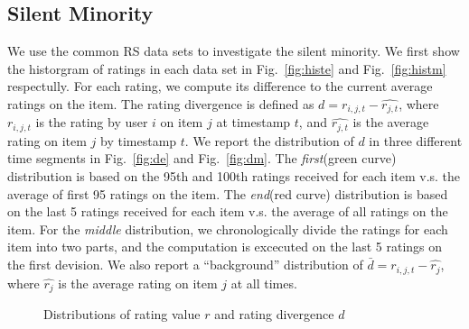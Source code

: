 \documentclass{sig-alternate}
\begin{document}
\subsection{Silent Minority}
 We use the common RS data sets to investigate the silent minority. We first show the historgram of ratings in each data set in Fig.~\ref{fig:histe} and Fig.~\ref{fig:histm} respectully. For each rating, we compute its difference to the current average ratings on the item. The rating divergence is defined as $d=r_{i,j,t}-\hat{r_{j,t}}$, where $r_{i,j,t}$ is the rating by user $i$ on item $j$ at timestamp $t$, and $\hat{r_{j,t}}$ is the average rating on item $j$ by timestamp $t$. We report the distribution of $d$ in three different time segments in Fig.~\ref{fig:de} and Fig.~\ref{fig:dm}. The \textit{first}(green curve) distribution is based on the 95th and 100th ratings received for each item v.s. the average of first 95 ratings on the item. The \textit{end}(red curve) distribution is based on the last 5 ratings received for each item v.s. the average of all ratings on the item. For the \textit{middle} distribution, we chronologically divide the ratings for each item into two parts, and the computation is excecuted on the last 5 ratings on the first devision.  We also report a ``background'' distribution of $\bar{d}=r_{i,j,t}-\hat{r_{j}}$, where $\hat{r_{j}}$ is the average rating on item $j$ at all times.
\begin{figure}[htbp]
\centering
{}
\caption{Distributions of rating value $r$ and rating divergence $d$}\label{fig:minority}
\end{figure}
\end{document}
